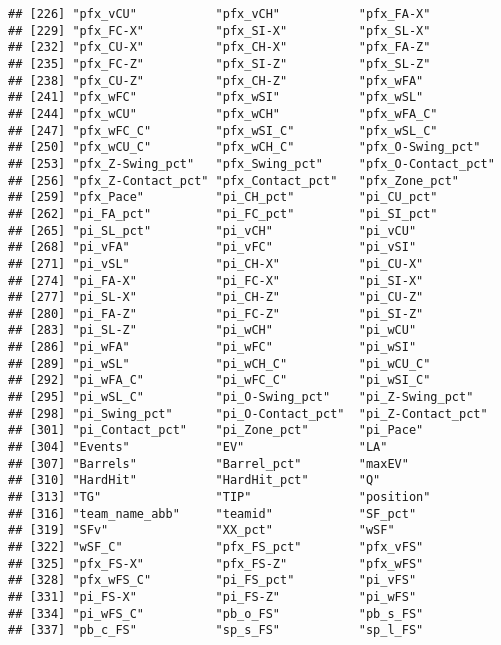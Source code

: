 \documentclass[
]{article}
\begin{document}
\begin{verbatim}
## [226] "pfx_vCU"           "pfx_vCH"           "pfx_FA-X"         
## [229] "pfx_FC-X"          "pfx_SI-X"          "pfx_SL-X"         
## [232] "pfx_CU-X"          "pfx_CH-X"          "pfx_FA-Z"         
## [235] "pfx_FC-Z"          "pfx_SI-Z"          "pfx_SL-Z"         
## [238] "pfx_CU-Z"          "pfx_CH-Z"          "pfx_wFA"          
## [241] "pfx_wFC"           "pfx_wSI"           "pfx_wSL"          
## [244] "pfx_wCU"           "pfx_wCH"           "pfx_wFA_C"        
## [247] "pfx_wFC_C"         "pfx_wSI_C"         "pfx_wSL_C"        
## [250] "pfx_wCU_C"         "pfx_wCH_C"         "pfx_O-Swing_pct"  
## [253] "pfx_Z-Swing_pct"   "pfx_Swing_pct"     "pfx_O-Contact_pct"
## [256] "pfx_Z-Contact_pct" "pfx_Contact_pct"   "pfx_Zone_pct"     
## [259] "pfx_Pace"          "pi_CH_pct"         "pi_CU_pct"        
## [262] "pi_FA_pct"         "pi_FC_pct"         "pi_SI_pct"        
## [265] "pi_SL_pct"         "pi_vCH"            "pi_vCU"           
## [268] "pi_vFA"            "pi_vFC"            "pi_vSI"           
## [271] "pi_vSL"            "pi_CH-X"           "pi_CU-X"          
## [274] "pi_FA-X"           "pi_FC-X"           "pi_SI-X"          
## [277] "pi_SL-X"           "pi_CH-Z"           "pi_CU-Z"          
## [280] "pi_FA-Z"           "pi_FC-Z"           "pi_SI-Z"          
## [283] "pi_SL-Z"           "pi_wCH"            "pi_wCU"           
## [286] "pi_wFA"            "pi_wFC"            "pi_wSI"           
## [289] "pi_wSL"            "pi_wCH_C"          "pi_wCU_C"         
## [292] "pi_wFA_C"          "pi_wFC_C"          "pi_wSI_C"         
## [295] "pi_wSL_C"          "pi_O-Swing_pct"    "pi_Z-Swing_pct"   
## [298] "pi_Swing_pct"      "pi_O-Contact_pct"  "pi_Z-Contact_pct" 
## [301] "pi_Contact_pct"    "pi_Zone_pct"       "pi_Pace"          
## [304] "Events"            "EV"                "LA"               
## [307] "Barrels"           "Barrel_pct"        "maxEV"            
## [310] "HardHit"           "HardHit_pct"       "Q"                
## [313] "TG"                "TIP"               "position"         
## [316] "team_name_abb"     "teamid"            "SF_pct"           
## [319] "SFv"               "XX_pct"            "wSF"              
## [322] "wSF_C"             "pfx_FS_pct"        "pfx_vFS"          
## [325] "pfx_FS-X"          "pfx_FS-Z"          "pfx_wFS"          
## [328] "pfx_wFS_C"         "pi_FS_pct"         "pi_vFS"           
## [331] "pi_FS-X"           "pi_FS-Z"           "pi_wFS"           
## [334] "pi_wFS_C"          "pb_o_FS"           "pb_s_FS"          
## [337] "pb_c_FS"           "sp_s_FS"           "sp_l_FS"          

\end{verbatim}
\end{document}
